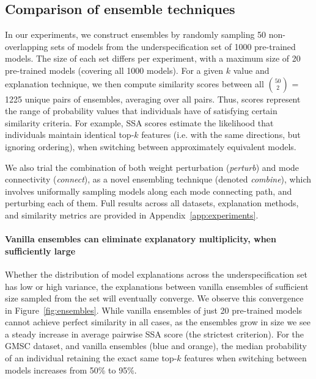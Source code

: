 \subsection{Comparison of ensemble techniques}
\label{subsec:experiments_ensemble}

In our experiments, we construct ensembles by randomly sampling 50 non-overlapping sets of models from the underspecification set of 1000 pre-trained models. The size of each set differs per experiment, with a maximum size of 20 pre-trained models (covering all 1000 models). For a given $k$ value and explanation technique, we then compute similarity scores between all $\binom{50}{2}$ = 1225 unique pairs of ensembles, averaging over all pairs. Thus, scores represent the range of probability values that individuals have of satisfying certain similarity criteria. For example, SSA scores estimate the likelihood that individuals maintain identical top-$k$ features (i.e. with the same directions, but ignoring ordering), when switching between approximately equivalent models.

We also trial the combination of both weight perturbation (\textit{perturb}) and mode connectivity (\textit{connect}), as a novel ensembling technique (denoted \textit{combine}), which involves uniformally sampling models along each mode connecting path, and perturbing each of them. Full results across all datasets, explanation methods, and similarity metrics are provided in Appendix~\ref{app:experiments}.


\paragraph{Vanilla ensembles can eliminate explanatory multiplicity, when sufficiently large} Whether the distribution of model explanations across the underspecification set has low or high variance, the explanations between vanilla ensembles of sufficient size sampled from the set will eventually converge. We observe this convergence in Figure~\ref{fig:ensembles}. While vanilla ensembles of just 20 pre-trained models cannot achieve perfect similarity in all cases, as the ensembles grow in size we see a steady increase in average pairwise SSA score (the strictest criterion). For the GMSC dataset, and vanilla ensembles (blue and orange), the median probability of an individual retaining the exact same top-$k$ features when switching between models increases from 50\% to 95\%.

